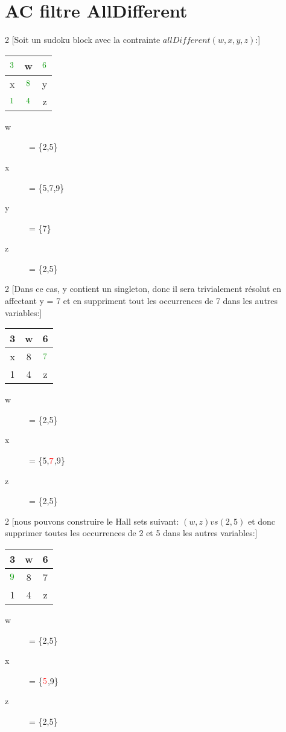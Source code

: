 \section{AC filtre AllDifferent}

\begin{multicols}{2}
[Soit un sudoku block avec la contrainte $allDifferent(w,x,y,z)$:]
\begin{tabular}{|c|c|c|}
\hline $\cvert{3}$ & w & $\cvert{6}$\\
\hline x & $\cvert{8}$ & y\\
\hline $\cvert{1}$ & $\cvert{4}$ & z\\
\hline
\end{tabular}
\begin{description}
\item[w] = \{2,5\}
\item[x] = \{5,7,9\}
\item[y] = \{7\}
\item[z] = \{2,5\}
\end{description}
\end{multicols}

\begin{multicols}{2}
[Dans ce cas, y contient un singleton, donc il sera trivialement résolut en affectant y = 7 et en suppriment tout les occurrences de 7 dans les autres variables:]
\begin{tabular}{|c|c|c|}
\hline 3 & w & 6\\
\hline x & 8 & $\cvert{7}$\\
\hline 1 & 4 & z\\
\hline
\end{tabular}
\begin{description}
\item[w] = \{2,5\}
\item[x] = \{5,$\textcolor{red}{7}$,9\}
\item[z] = \{2,5\}
\end{description}
\end{multicols}

\begin{multicols}{2}
[nous pouvons construire le Hall sets suivant: $(w,z) vs (2,5)$ et donc supprimer toutes les occurrences de 2 et 5 dans les autres variables:]
\begin{tabular}{|c|c|c|}
\hline 3 & w & 6\\
\hline $\cvert{9}$ & 8 & 7\\
\hline 1 & 4 & z\\
\hline
\end{tabular}
\begin{description}
\item[w] = \{2,5\}
\item[x] = \{$\textcolor{red}{5}$,9\}
\item[z] = \{2,5\}
\end{description}
\end{multicols}

